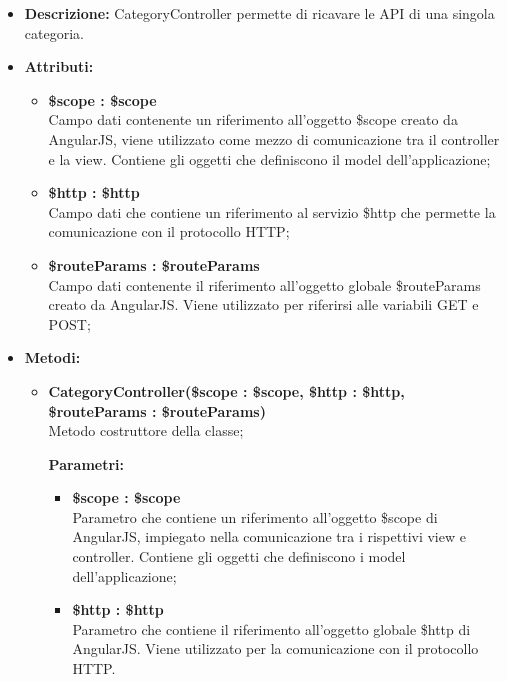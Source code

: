 \begin{itemize}
	\item \textbf{Descrizione:} CategoryController permette di ricavare le API di una singola categoria.
	\item \textbf{Attributi:}
	\begin{itemize}
		
		\item \textbf{\$scope : \$scope}\\
		Campo dati contenente un riferimento all'oggetto \$scope creato da AngularJS, viene utilizzato come mezzo di comunicazione tra il controller e la view. Contiene gli oggetti che definiscono il model dell'applicazione;
		
		\item \textbf{\$http : \$http }\\
		Campo dati che contiene un riferimento al servizio \$http che permette la comunicazione con il protocollo HTTP;
		
		\item \textbf{\$routeParams : \$routeParams }\\
		Campo dati contenente il riferimento all'oggetto globale \$routeParams creato da AngularJS. Viene utilizzato per riferirsi alle variabili GET e POST;				
		
	\end{itemize}
	\item \textbf{Metodi:}
	\begin{itemize}
		
		\item \textbf{CategoryController(\$scope : \$scope, \$http : \$http, \$routeParams : \$routeParams)}\\
		Metodo costruttore della classe;
		\begin{description}
			\item[\textbf{Parametri:}]
		\end{description}
		\begin{itemize}
			\item \textbf{\$scope : \$scope}\\
			Parametro che contiene un riferimento all'oggetto \$scope di AngularJS, impiegato nella comunicazione tra i rispettivi view e controller. Contiene gli oggetti che definiscono i model dell'applicazione;
			
			\item \textbf{\$http : \$http}\\
			Parametro che contiene il riferimento all'oggetto globale \$http di AngularJS. Viene utilizzato per la comunicazione con il protocollo HTTP.
			

\end{itemize}
\end{itemize}
\end{itemize}
